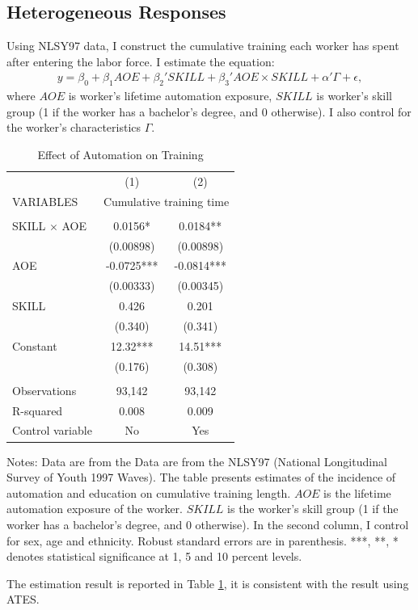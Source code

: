 \documentclass[12pt]{article}
\begin{document}
\begin{appendices}
\subsection{Heterogeneous Responses}
Using NLSY97 data, I construct the cumulative training each worker has spent after entering the labor force.  I estimate the equation: 
\begin{align}
y = \beta_0 + \beta_1 AOE + \beta_2' SKILL +\beta_3' AOE \times SKILL  +\alpha' \Gamma + \epsilon,
\end{align}
where $AOE$ is worker's lifetime automation exposure, $SKILL$ is worker's skill group (1 if the worker has a bachelor's degree, and 0 otherwise). I also control for the worker's characteristics $\Gamma$. 
\begin{table}[h!]
\begin{center}
\scriptsize
\begin{tabular}{lcc} \hline \hline
 & (1) & (2) \\
VARIABLES & \multicolumn{2}{c}{Cumulative training time} \\ \hline
 &  &  \\
SKILL $\times$ AOE & 0.0156* & 0.0184** \\
 & (0.00898) & (0.00898) \\
AOE & -0.0725*** & -0.0814*** \\
 & (0.00333) & (0.00345) \\
SKILL & 0.426 & 0.201 \\
 & (0.340) & (0.341) \\
Constant & 12.32*** & 14.51*** \\
 & (0.176) & (0.308) \\
 &  &  \\
Observations & 93,142 & 93,142 \\
 R-squared & 0.008 & 0.009 \\ \hline
  Control variable & No & Yes \\  \hline
 \end{tabular}
\end{center}
\caption{Effect of Automation on Training}
\label{estimation6}
{\scriptsize Notes: Data are from the Data are from the NLSY97 (National Longitudinal Survey of Youth 1997 Waves). The table presents estimates of the incidence of automation and education on cumulative training length. $AOE$ is the lifetime automation exposure of the worker. $SKILL$ is the worker's skill group (1 if the worker has a bachelor's degree, and 0 otherwise). In the second column, I control for sex, age and ethnicity. Robust standard errors are in parenthesis. ***, **, * denotes statistical significance at 1, 5 and 10 percent levels.}
\end{table}
\end{appendices}

The estimation result is reported in Table \ref{estimation6}, it is consistent with the result using ATES. 
\end{document}
